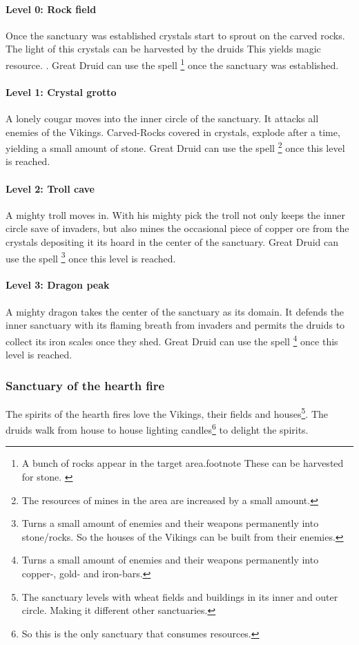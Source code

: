 \documentclass[a4paper]{book}
\begin{document}
\paragraph{Level 0: Rock field}
Once the sanctuary was established crystals start to sprout on the carved
rocks. The light of this crystals can be harvested by the druids{ This yields
		magic resource. }. Great Druid can use the spell \footnote{ A bunch of rocks appear in the target area.footnote{ These can
			be harvested for stone. } } once the sanctuary was established.

\paragraph{Level 1: Crystal grotto}
A lonely cougar moves into the inner circle of the sanctuary. It attacks all
enemies of the \gls{Vikings}. Carved-Rocks covered in crystals, explode after a
time, yielding a small amount of stone. Great Druid can use the spell
\footnote{ The resources of mines in the
	area are increased by a small amount. } once this level is reached.

\paragraph{Level 2: Troll cave}
A mighty troll moves in. With his mighty pick the troll not only keeps the
inner circle save of invaders, but also mines the occasional piece of copper
ore from the crystals depositing it its hoard in the center of the sanctuary.
Great Druid can use the spell \footnote{ Turns a
	small amount of enemies and their weapons permanently into stone/rocks. So the
	houses of the \gls{Vikings} can be built from their enemies. } once this level
is reached.

\paragraph{Level 3: Dragon peak}
A mighty dragon takes the center of the sanctuary as its domain. It defends the
inner sanctuary with its flaming breath from invaders and permits the druids to
collect its iron scales once they shed. Great Druid can use the spell
\footnote{ Turns a small amount of enemies and their
	weapons permanently into copper-, gold- and iron-bars. } once this level is
reached.

\subsubsection{Sanctuary of the hearth fire}
The spirits of the hearth fires love the \gls{Vikings}, their fields and
houses\footnote{ The sanctuary levels with wheat fields and buildings in its
	inner and outer circle. Making it different other sanctuaries. }. The druids
walk from house to house lighting candles\footnote{ So this is the only
	sanctuary that consumes resources. } to delight the spirits.
\end{document}

